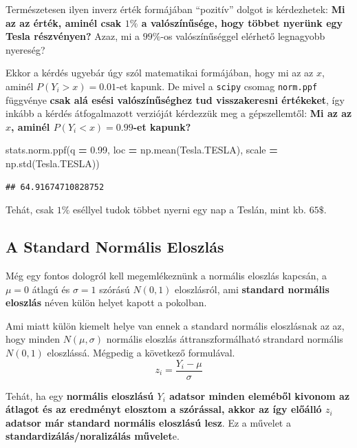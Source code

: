 \documentclass[
]{book}
\newenvironment{Shaded}{\begin{snugshade}}{\end{snugshade}}
\newcommand{\FloatTok}[1]{\textcolor[rgb]{0.00,0.00,0.81}{#1}}
\newcommand{\NormalTok}[1]{#1}
\newcommand{\OperatorTok}[1]{\textcolor[rgb]{0.81,0.36,0.00}{\textbf{#1}}}
\begin{document}
Természetesen ilyen inverz érték formájában ``pozitív'' dolgot is kérdezhetek: \textbf{Mi az az érték, aminél csak \(1\%\) a valószínűsége, hogy többet nyerünk egy Tesla részvényen?} Azaz, mi a \(99\%\)-os valószínűséggel elérhető legnagyobb nyereség?

Ekkor a kérdés ugyebár úgy szól matematikai formájában, hogy mi az az \(x\), aminél \(P(Y_i>x)=0.01\)-et kapunk. De mivel a \texttt{scipy} csomag \texttt{norm.ppf} függvénye \textbf{csak alá esési valószínűséghez tud visszakeresni értékeket}, így inkább a kérdés átfogalmazott verzióját kérdezzük meg a gépszellemtől: \textbf{Mi az az \(x\), aminél \(P(Y_i<x)=0.99\)-et kapunk?}

\begin{Shaded}
\begin{Highlighting}[]
\NormalTok{stats.norm.ppf(q }\OperatorTok{=} \FloatTok{0.99}\NormalTok{, loc }\OperatorTok{=}\NormalTok{ np.mean(Tesla.TESLA), scale }\OperatorTok{=}\NormalTok{ np.std(Tesla.TESLA))}
\end{Highlighting}
\end{Shaded}

\begin{verbatim}
## 64.91674710828752
\end{verbatim}

Tehát, csak \(1\%\) eséllyel tudok többet nyerni egy nap a Teslán, mint kb. \(65\$\).

\subsection{A Standard Normális Eloszlás}\label{a-standard-normuxe1lis-eloszluxe1s}

Még egy fontos dologról kell megemlékeznünk a normális eloszlás kapcsán, a \(\mu=0\) átlagú és \(\sigma=1\) szórású \(N(0,1)\) eloszlásról, ami \textbf{standard normális eloszlás} néven külön helyet kapott a pokolban.

Ami miatt külön kiemelt helye van ennek a standard normális eloszlásnak az az, hogy minden \(N(\mu,\sigma)\) normális eloszlás áttranszformálható strandard normális \(N(0,1)\) eloszlássá. Mégpedig a következő formulával. \[z_i=\frac{Y_i-\mu}{\sigma}\]

Tehát, ha egy \textbf{normális eloszlású \(Y_i\) adatsor minden eleméből kivonom az átlagot és az eredményt elosztom a szórással, akkor az így előálló \(z_i\) adatsor már standard normális eloszlású lesz}. Ez a művelet a \textbf{standardizálás/noralizálás művelet}e.
\end{document}
